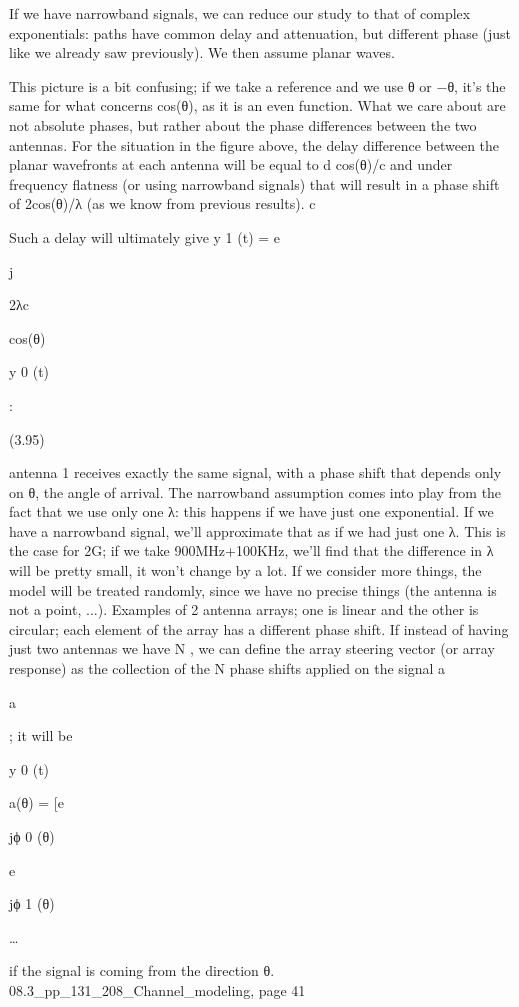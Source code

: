 {{{{If we have narrowband signals, we can reduce our study to that of complex exponentials: paths have common delay and attenuation, but different phase (just like we already saw previously).
We then assume planar waves.

This picture is a bit confusing; if we take a reference and we use θ or −θ, it's the same for what concerns cos(θ), as it is an even function.
What we care about are not absolute phases, but rather about the phase differences between the two antennas.
For the situation in the figure above, the delay difference between the planar wavefronts at each antenna will be equal to d cos(θ)/c and under frequency flatness (or using narrowband signals) that will result in a phase shift of 2\pid cos(θ)/λ (as we know from previous results).
c

Such a delay will ultimately give y 1 (t) = e

j

2\pid λc

cos(θ)

y 0 (t)

:

(3.95)

antenna 1 receives exactly the same signal, with a phase shift that depends only on θ,
the angle of arrival.
The narrowband assumption comes into play from the fact that we use only one λ: this happens if we have just one exponential. If we have a narrowband signal, we'll approximate that as if we had just one λ.
This is the case for 2G; if we take 900MHz+100KHz, we'll find that the difference in λ will be pretty small, it won't change by a lot.
If we consider more things, the model will be treated randomly, since we have no precise things (the antenna is not a point, ...).
Examples of 2 antenna arrays; one is linear and the other is circular; each element of the array has a different phase shift.
If instead of having just two antennas we have N , we can define the array steering vector (or array response) as the collection of the N phase shifts applied on the signal a

a

; it will be

y 0 (t)

a(θ) = [e

jϕ 0 (θ)

e

jϕ 1 (θ)

…

if the signal is coming from the direction θ.
08.3_pp_131_208_Channel_modeling, page 41

}}}}
